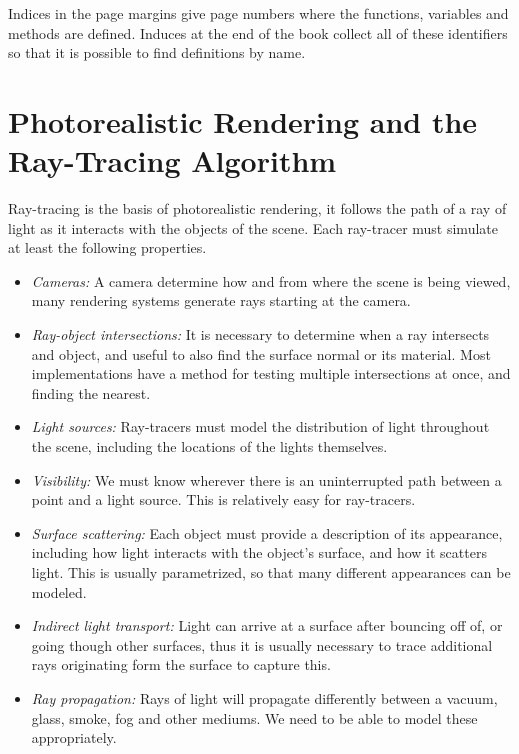 \documentclass[
]{book}
\providecommand{\tightlist}{%
  \setlength{\itemsep}{0pt}\setlength{\parskip}{0pt}}
\begin{document}
Indices in the page margins give page numbers where the functions, variables and
methods are defined. Induces at the end of the book collect all of these
identifiers so that it is possible to find definitions by name.

\hypertarget{photorealistic-rendering-and-the-ray-tracing-algorithm}{%
\section{Photorealistic Rendering and the Ray-Tracing Algorithm}\label{photorealistic-rendering-and-the-ray-tracing-algorithm}}

Ray-tracing is the basis of photorealistic rendering, it follows the path of a
ray of light as it interacts with the objects of the scene. Each ray-tracer
must simulate at least the following properties.

\begin{itemize}
\tightlist
\item
  \emph{Cameras:} A camera determine how and from where the scene is being viewed,
  many rendering systems generate rays starting at the camera.
\item
  \emph{Ray-object intersections:} It is necessary to determine when a ray
  intersects and object, and useful to also find the surface normal or its
  material. Most implementations have a method for testing multiple
  intersections at once, and finding the nearest.
\item
  \emph{Light sources:} Ray-tracers must model the distribution of light throughout
  the scene, including the locations of the lights themselves.
\item
  \emph{Visibility:} We must know wherever there is an uninterrupted path between a
  point and a light source. This is relatively easy for ray-tracers.
\item
  \emph{Surface scattering:} Each object must provide a description of its
  appearance, including how light interacts with the object's surface, and
  how it scatters light. This is usually parametrized, so that many different
  appearances can be modeled.
\item
  \emph{Indirect light transport:} Light can arrive at a surface after bouncing off
  of, or going though other surfaces, thus it is usually necessary to trace
  additional rays originating form the surface to capture this.
\item
  \emph{Ray propagation:} Rays of light will propagate differently between a vacuum,
  glass, smoke, fog and other mediums. We need to be able to model these
  appropriately.
\end{itemize}
\end{document}

